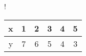 {\columnwidth}{!} {
	\begin{tabular}{|c|c|c|c|c|c|}
		\hline
		x &1 &2&3 & 4& 5 \\
		\hline
		y &7 & 6 & 5 &4 & 3\\
		\hline
	\end{tabular}
}
